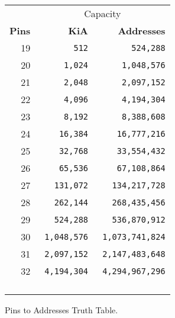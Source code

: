 \begin{figure}[H]
\begin{minipage}[t]{0.49\linewidth}
{\begin{tabular}{rrr}
  & \multicolumn{2}{c}{Capacity} \\
  \cmidrule(lr){2-3}
  
 
 \textbf{Pins} & \textbf{KiA} & \textbf{Addresses}\\               
            
  \toprule    
19   &    \texttt{512}           &\texttt{524,288}    \\
20           &\texttt{1,024}            &      \texttt{1,048,576} \\
21           &    \texttt{2,048} &\texttt{2,097,152}    \\
22           &    \texttt{4,096} &\texttt{4,194,304}    \\
23            &    \texttt{8,192} &      \texttt{8,388,608} \\
24           &    \texttt{16,384} &\texttt{16,777,216}    \\
25           &    \texttt{32,768} &      \texttt{33,554,432} \\
26            &\texttt{65,536}            &\texttt{67,108,864}    \\
27           &\texttt{131,072}            &\texttt{134,217,728}    \\
28           &    \texttt{262,144} &\texttt{268,435,456}    \\
29          &    \texttt{524,288} &\texttt{536,870,912}    \\
30          &    \texttt{1,048,576} &      \texttt{1,073,741,824} \\
31          &    \texttt{2,097,152} &      \texttt{2,147,483,648} \\
32          &    \texttt{ 4,194,304} &      \texttt{ 4,294,967,296} \\
            &              &         \\
            &               &        \\
             &               &         \\
            &               &         \\
  \toprule    
\end{tabular}%
}
\end{minipage}
\caption*{Pins to Addresses Truth Table.}
\end{figure}

